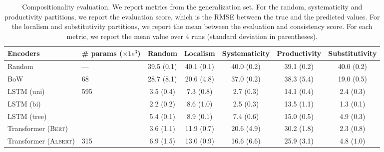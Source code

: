 \begin{table}[t]
    \footnotesize
    \begin{tabularx}{16cm}{lY|ccccc}
    \toprule
    \textbf{Encoders} & \textbf{\# params} ($\times 1e^3$) & \textbf{Random} & \textbf{Localism} & \textbf{Systematicity} & \textbf{Productivity} & \textbf{Substitutivity} \\
    \midrule
    Random & --- & 39.5 {\scriptsize (0.1)} & 40.1 {\scriptsize (0.1)} & 40.0  {\scriptsize (0.2)} & 39.1 {\scriptsize (0.2)} & 40.0 {\scriptsize (0.2)} \\
    BoW & 68 & 28.7 {\scriptsize (8.1)} & 20.6 {\scriptsize (4.8)} & 37.0 {\scriptsize (0.2)} & 38.3 {\scriptsize (5.4)} & 19.0 {\scriptsize (0.5)} \\
    \addlinespace
    \textsc{LSTM} (uni) & 595 & 3.5 {\scriptsize (0.4)} & 7.3 {\scriptsize (0.8)} & 2.7 {\scriptsize (0.3)} & 14.1 {\scriptsize (0.4)} & 2.4 {\scriptsize (0.3)} \\
    \textsc{LSTM} (bi) &  & 2.2 {\scriptsize (0.2)} & 8.6 {\scriptsize (1.0)} & 2.5 {\scriptsize (0.3)} & 13.5 {\scriptsize (1.1)} & 1.3 {\scriptsize (0.1)} \\
    \textsc{LSTM} (tree) &  & 5.4 {\scriptsize (0.1)} & 8.9 {\scriptsize (0.1)} & 7.4 {\scriptsize (0.6)} & 15.0 {\scriptsize (0.5)} & 4.9 {\scriptsize (0.3)} \\
    \addlinespace
    Transformer (\textsc{Bert}) &  & 3.6 {\scriptsize (1.1)} & 11.9 {\scriptsize (0.7)} &  20.6 {\scriptsize (4.9)} & 30.2 {\scriptsize (1.8)} &	2.3 {\scriptsize (0.8)} \\
    Transformer (\textsc{Albert}) & 315 & 6.9 {\scriptsize (1.5)} & 13.0 {\scriptsize (0.9)} & 16.6 {\scriptsize (6.6)} & 25.9 {\scriptsize (3.1)} &	 4.8 {\scriptsize (1.0)} \\
    \bottomrule
    \end{tabularx}
    \caption{Compositionality evaluation. We report metrics from the generalization set. For the random, systematicity and productivity partitions, we report the evaluation score, which is the RMSE between the true and the predicted values. For the localism and substitutivity partitions, we report the mean between the evaluation and consistency score. For each metric, we report the mean value over 4 runs (standard deviation in parentheses).} %
    \label{table:results-main}
\end{table}

